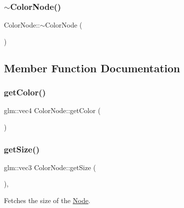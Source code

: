 \mbox{\label{classsage_1_1ColorNode_af1864690840922c8b14340d6991eac3e}} 
\subsubsection{\texorpdfstring{$\sim$ColorNode()}{~ColorNode()}}
{\footnotesize\ttfamily Color\+Node\+::$\sim$\+Color\+Node (\begin{DoxyParamCaption}{ }\end{DoxyParamCaption})}



\subsection{Member Function Documentation}
\mbox{\label{classsage_1_1ColorNode_af6d7433a247a53dc58019aeadc042008}} 
\subsubsection{\texorpdfstring{getColor()}{getColor()}}
{\footnotesize\ttfamily glm\+::vec4 Color\+Node\+::get\+Color (\begin{DoxyParamCaption}{ }\end{DoxyParamCaption})}

\mbox{\label{classsage_1_1ColorNode_ad2ffce290e2cde1697ae609fe0a7b68c}} 
\subsubsection{\texorpdfstring{getSize()}{getSize()}}
{\footnotesize\ttfamily glm\+::vec3 Color\+Node\+::get\+Size (\begin{DoxyParamCaption}{ }\end{DoxyParamCaption})\hspace{0.3cm}{\ttfamily [override]}, {\ttfamily [virtual]}}



Fetches the size of the \mbox{\hyperlink{classsage_1_1Node}{Node}}. 

